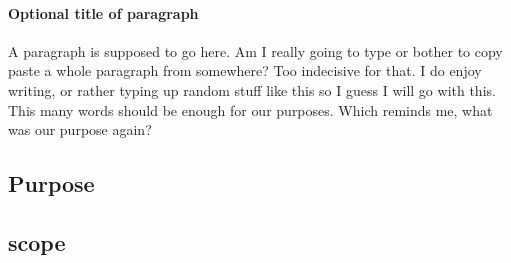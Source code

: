 \documentclass{article}
\begin{document}
	\paragraph{Optional title of paragraph}
	A paragraph is supposed to go here. Am I really going to type or bother to copy paste a whole paragraph from somewhere? Too indecisive for that. I do enjoy writing, or rather typing up random stuff like this so I guess I will go with this. This many words should be enough for our purposes. Which reminds me, what was our purpose again?

	\subsection{Purpose}

	\subsection{scope}
\end{document}
